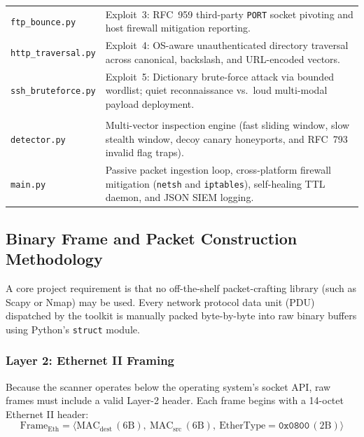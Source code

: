 \begin{table}[!ht]
\begin{tabularx}{\textwidth}{@{}L{4.2cm} X@{}}
\texttt{ftp\_bounce.py} & Exploit~3: RFC~959 third-party \texttt{PORT} socket pivoting and host firewall mitigation reporting.\\
\texttt{http\_traversal.py} & Exploit~4: OS-aware unauthenticated directory traversal across canonical, backslash, and URL-encoded vectors.\\
\texttt{ssh\_bruteforce.py} & Exploit~5: Dictionary brute-force attack via bounded wordlist; quiet reconnaissance vs.\ loud multi-modal payload deployment.\\
\addlinespace[2pt]
\\
\texttt{detector.py} & Multi-vector inspection engine (fast sliding window, slow stealth window, decoy canary honeyports, and RFC~793 invalid flag traps).\\
\texttt{main.py} & Passive packet ingestion loop, cross-platform firewall mitigation (\texttt{netsh} and \texttt{iptables}), self-healing TTL daemon, and JSON SIEM logging.\\
\bottomrule
\end{tabularx}
\end{table}

\subsection{Binary Frame and Packet Construction Methodology}
A core project requirement is that no off-the-shelf packet-crafting library (such
as Scapy or Nmap) may be used. Every network protocol data unit (PDU) dispatched by the
toolkit is manually packed byte-by-byte into raw binary buffers using Python's \texttt{struct}
module.

\subsubsection{Layer 2: Ethernet II Framing}
Because the scanner operates below the operating system's socket API, raw frames must include
a valid Layer-2 header. Each frame begins with a 14-octet Ethernet II header:
\begin{equation}
\text{Frame}_{\text{Eth}} = \langle \text{MAC}_{\text{dest}}\,(6\text{B}), \ \text{MAC}_{\text{src}}\,(6\text{B}), \ \text{EtherType} = \mathtt{0x0800}\,(2\text{B}) \rangle
\end{equation}

